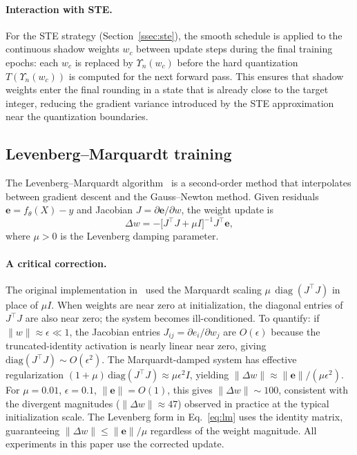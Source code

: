\documentclass[12pt,a4paper]{article}
\begin{document}
\paragraph{Interaction with STE.}
For the STE strategy (Section~\ref{ssec:ste}), the smooth schedule is
applied to the continuous shadow weights $w_c$ between update steps during
the final training epochs: each $w_c$ is replaced by $\Upsilon_n(w_c)$
before the hard quantization $T(\Upsilon_n(w_c))$ is computed for the next
forward pass.
This ensures that shadow weights enter the final rounding in a state
that is already close to the target integer, reducing the gradient variance
introduced by the STE approximation near the quantization boundaries.

\subsection{Levenberg--Marquardt training}
\label{ssec:lm}

The Levenberg--Marquardt algorithm~\cite{levenberg1944,marquardt1963} is a
second-order method that interpolates between gradient descent and the
Gauss--Newton method.
Given residuals $\mathbf{e} = f_\theta(X) - y$ and Jacobian
$J = \partial \mathbf{e}/\partial w$, the weight update is
\begin{equation}
  \Delta w = -\bigl[J^\top J + \mu I\bigr]^{-1} J^\top \mathbf{e},
  \label{eq:lm}
\end{equation}
where $\mu > 0$ is the Levenberg damping parameter.

\paragraph{A critical correction.}
The original implementation in~\cite{leandro2009} used the Marquardt scaling
$\mu\,\operatorname{diag}(J^\top J)$ in place of $\mu I$.
When weights are near zero at initialization, the diagonal entries of
$J^\top J$ are also near zero; the system becomes ill-conditioned.
To quantify: if $\|w\| \approx \epsilon \ll 1$, the Jacobian entries
$J_{ij} = \partial e_i/\partial w_j$ are $O(\epsilon)$ because the
truncated-identity activation is nearly linear near zero, giving
$\mathrm{diag}(J^\top J) \sim O(\epsilon^2)$.
The Marquardt-damped system has effective regularization
$(1+\mu)\,\mathrm{diag}(J^\top J) \approx \mu\epsilon^2 I$, yielding
$\|\Delta w\| \approx \|\mathbf{e}\|/(\mu\epsilon^2)$.
For $\mu = 0.01$, $\epsilon = 0.1$, $\|\mathbf{e}\| = O(1)$, this gives
$\|\Delta w\| \sim 100$, consistent with the divergent magnitudes
($\|\Delta w\| \approx 47$) observed in practice at the typical
initialization scale.
The Levenberg form in Eq.~\eqref{eq:lm} uses the identity matrix, guaranteeing
$\|\Delta w\| \leq \|\mathbf{e}\|/\mu$ regardless of the weight magnitude.
All experiments in this paper use the corrected update.
\end{document}
